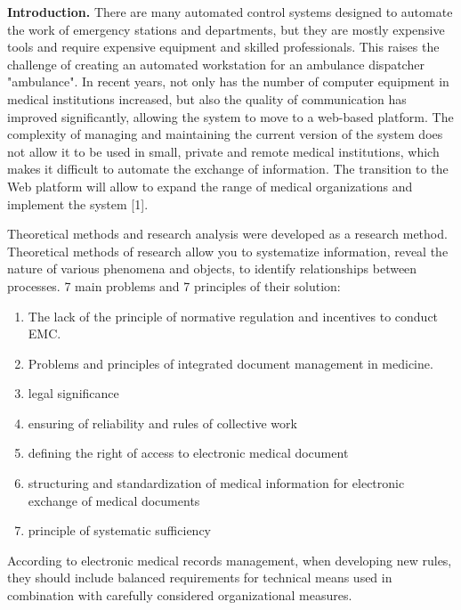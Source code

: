 \begin{multicols}{2}
{\bfseries Introduction.} There are many automated control systems designed
to automate the work of emergency stations and departments, but they are
mostly expensive tools and require expensive equipment and skilled
professionals. This raises the challenge of creating an automated
workstation for an ambulance dispatcher "ambulance". In recent years,
not only has the number of computer equipment in medical institutions
increased, but also the quality of communication has improved
significantly, allowing the system to move to a web-based platform. The
complexity of managing and maintaining the current version of the system
does not allow it to be used in small, private and remote medical
institutions, which makes it difficult to automate the exchange of
information. The transition to the Web platform will allow to expand the
range of medical organizations and implement the system {[}1{]}.

Theoretical methods and research analysis were developed as a research
method. Theoretical methods of research allow you to systematize
information, reveal the nature of various phenomena and objects, to
identify relationships between processes. 7 main problems and 7
principles of their solution:

\begin{enumerate}
\item
The lack of the principle of normative regulation and incentives to
conduct EMC.

\item
Problems and principles of integrated document management in medicine.

\item
legal significance

\item
ensuring of reliability and rules of collective work

\item
defining the right of access to electronic medical document

\item
structuring and standardization of medical information for electronic
exchange of medical documents

\item
principle of systematic sufficiency
\end{enumerate}

According to electronic medical records management, when developing new
rules, they should include balanced requirements for technical means
used in combination with carefully considered organizational measures.


\end{multicols}
